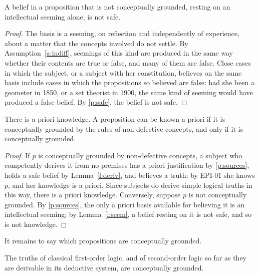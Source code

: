 \documentclass{situationist-preprint}
\begin{document}
\begin{lemma}\label{l:seem}
A belief in a proposition that is not conceptually grounded, resting on an intellectual seeming alone, is not safe.
\end{lemma}

\begin{proof}
The basis is a seeming, on reflection and independently of experience, about a matter that the concepts involved do not settle. By Assumption~\ref{a:indiff}, seemings of this kind are produced in the same way whether their contents are true or false, and many of them are false. Close cases in which the subject, or a subject with her constitution, believes on the same basis include cases in which the propositions so believed are false: had she been a geometer in 1850, or a set theorist in 1900, the same kind of seeming would have produced a false belief. By \ref{p:safe}, the belief is not safe.
\end{proof}

\begin{theorem}[Scope]\label{t:scope}
There is a priori knowledge. A proposition can be known a priori if it is conceptually grounded by the rules of non-defective concepts, and only if it is conceptually grounded.
\end{theorem}

\begin{proof}
If $p$ is conceptually grounded by non-defective concepts, a subject who competently derives it from no premises has a priori justification by \ref{p:sources}, holds a safe belief by Lemma~\ref{l:deriv}, and believes a truth; by EPI-01 she knows $p$, and her knowledge is a priori. Since subjects do derive simple logical truths in this way, there is a priori knowledge. Conversely, suppose $p$ is not conceptually grounded. By \ref{p:sources}, the only a priori basis available for believing it is an intellectual seeming; by Lemma~\ref{l:seem}, a belief resting on it is not safe, and so is not knowledge.
\end{proof}

It remains to say which propositions are conceptually grounded.

\begin{proposition}[Logic]\label{p:logic}
The truths of classical first-order logic, and of second-order logic so far as they are derivable in its deductive system, are conceptually grounded.
\end{proposition}
\end{document}
